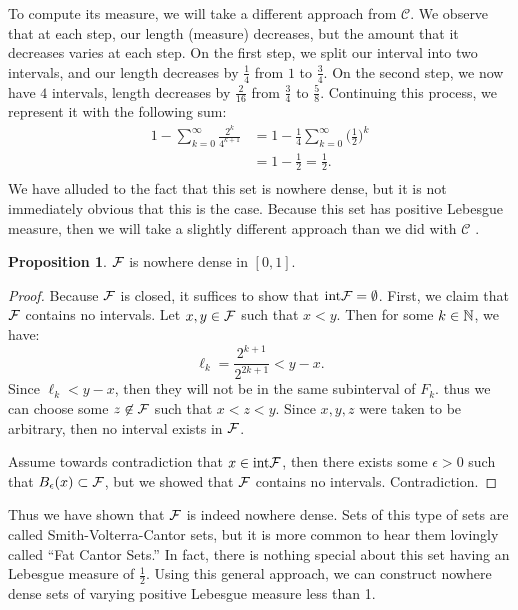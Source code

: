 \documentclass{article}
\theoremstyle{axiom} \newtheorem{axiom}{Axiom}
\theoremstyle{definition} \newtheorem{definition}{Definition}
\theoremstyle{example} \newtheorem{example}{Example}
\theoremstyle{proposition} \newtheorem{prop}{Proposition}
\theoremstyle{lemma} \newtheorem{lemma}{Lemma}
\newcommand{\sC}{\mathcal{C}}  \newcommand{\sD}{\mathcal{D}}
\begin{document}
To compute its measure, we will take a different approach from $\sC$. We observe that
at each step, our length (measure) decreases, but the amount that it decreases
varies at each step. On the first step, we split our interval into two intervals, and
our length decreases by $\frac{1}{4}$ from $1$ to $\frac{3}{4}$. On the second 
step, we now have $4$ intervals, length decreases by $\frac{2}{16}$ from 
$\frac{3}{4}$ to $\frac{5}{8}$. Continuing this process, we represent
it with the following sum:
\begin{equation*}
	\begin{split}
		1 -\sum^{\infty}_{k=0} \frac{2^k}{4^{k+1}} &=
		1 -\frac{1}{4} \sum^{\infty}_{k=0} \bigg(\frac{1}{2}\bigg)^{k} \\
		&= 1-\frac{1}{2} = \frac{1}{2}.\\
	\end{split}
\end{equation*}
We have alluded to the fact that this set is nowhere dense, but it is not
immediately obvious that this is the case. Because this set has positive
Lebesgue measure, then we will take a slightly different approach than we did 
with $\sC$ \cite{merx:2015}.
\begin{prop} \label{prp:fat}
	$\mathcal{F}$ is nowhere dense in $[0,1]$.
\end{prop}
\begin{proof}
	Because $\mathcal{F}$ is closed, it suffices to show that $\mathrm{int}\mathcal{F} =
	\emptyset$. First, we claim that $\mathcal{F}$ contains no intervals. 
	Let $x,y \in \mathcal{F}$ such that $x < y$. Then for some $k \in \mathbb{N}$, we have:
	\begin{equation*}
		\ell_k = \frac{2^{k+1}}{2^{2k+1}} < y - x.
	\end{equation*}
	Since $\ell_k < y-x$, then they will not be in the same subinterval of $F_k$. 
	thus we can choose some $z \not \in \mathcal{F}$ such that $x < z < y$. Since
	$x,y,z$ were taken to be arbitrary, then no interval exists in $\mathcal{F}$. 

	Assume towards contradiction that $x \in \mathrm{int}\mathcal{F}$, then there
	exists some $\epsilon > 0$ such that $B_{\epsilon}(x) \subset \mathcal{F}$, but we
	showed that $\mathcal{F}$ contains no intervals. Contradiction.
\end{proof}

Thus we have shown that $\mathcal{F}$ is indeed nowhere dense. Sets of this type of sets 
are called  Smith-Volterra-Cantor sets, but it is more 
common to hear them lovingly called ``Fat Cantor Sets.'' In fact, there is
nothing special about this set having an Lebesgue measure of $\frac{1}{2}$. Using
this general approach, we can construct nowhere dense sets of varying positive Lebesgue
measure less than 1. 
\end{document}
